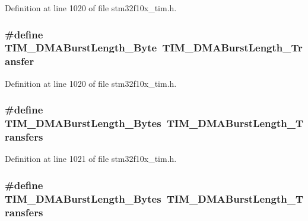 Definition at line 1020 of file stm32f10x\+\_\+tim.\+h.

\subsubsection[{\texorpdfstring{T\+I\+M\+\_\+\+D\+M\+A\+Burst\+Length\+\_\+1\+Byte}{TIM_DMABurstLength_1Byte}}]{\setlength{\rightskip}{0pt plus 5cm}\#define T\+I\+M\+\_\+\+D\+M\+A\+Burst\+Length\+\_\+Byte~{\bf T\+I\+M\+\_\+\+D\+M\+A\+Burst\+Length\+\_\+Transfer}}\hypertarget{group___t_i_m___legacy_gad915c67fae262b887f4f074809448309}{}\label{group___t_i_m___legacy_gad915c67fae262b887f4f074809448309}


Definition at line 1020 of file stm32f10x\+\_\+tim.\+h.

\subsubsection[{\texorpdfstring{T\+I\+M\+\_\+\+D\+M\+A\+Burst\+Length\+\_\+2\+Bytes}{TIM_DMABurstLength_2Bytes}}]{\setlength{\rightskip}{0pt plus 5cm}\#define T\+I\+M\+\_\+\+D\+M\+A\+Burst\+Length\+\_\+Bytes~{\bf T\+I\+M\+\_\+\+D\+M\+A\+Burst\+Length\+\_\+Transfers}}\hypertarget{group___t_i_m___legacy_gabed2d89b663148923f4a7ca63d62d947}{}\label{group___t_i_m___legacy_gabed2d89b663148923f4a7ca63d62d947}


Definition at line 1021 of file stm32f10x\+\_\+tim.\+h.

\subsubsection[{\texorpdfstring{T\+I\+M\+\_\+\+D\+M\+A\+Burst\+Length\+\_\+2\+Bytes}{TIM_DMABurstLength_2Bytes}}]{\setlength{\rightskip}{0pt plus 5cm}\#define T\+I\+M\+\_\+\+D\+M\+A\+Burst\+Length\+\_\+Bytes~{\bf T\+I\+M\+\_\+\+D\+M\+A\+Burst\+Length\+\_\+Transfers}}\hypertarget{group___t_i_m___legacy_gabed2d89b663148923f4a7ca63d62d947}{}\label{group___t_i_m___legacy_gabed2d89b663148923f4a7ca63d62d947}


